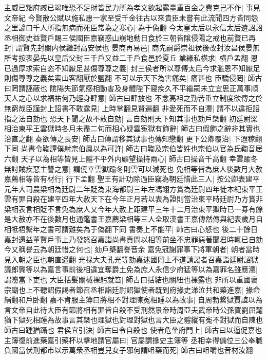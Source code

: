 主威已黜府臧已竭唯恐不足財皆民力所為孝文欲起露臺重百金之費克己不作|{
	事見文帝紀}
今賢散公賦以施私惠一家至受千金往古以來貴臣未嘗有此流聞四方皆同怨之里諺曰千人所指無病而死臣常為之寒心|{
	為于偽翻}
今太皇太后以永信太后遺詔詔丞相御史益賢戶賜三侯國臣嘉竊惑山崩地動日食於三朝皆隂侵陽之戒也前賢已再封|{
	謂賢先封關内侯繼封高安侯也}
晏商再易邑|{
	商先嗣爵崇祖侯後改封汝昌侯晏無所考按表晏先以皇后父封三千戶又益二千戶食邑於夏丘}
業緣私横求|{
	横戶孟翻}
恩已過厚求索自恣不知厭足甚傷尊尊之義|{
	封三侯者所以尊傅太后今求濫恩不知厭足則傷尊尊之義矣索山客翻厭於鹽翻}
不可以示天下為害痛矣|{
	痛甚也}
臣驕侵罔|{
	師古曰罔謂誣蔽也}
隂陽失節氣感相動害及身體陛下寢疾久不平繼嗣未立宜思正萬事順天人之心以求福祐何乃輕身肆意|{
	師古曰肆放也}
不念高祖之勤苦垂立制度欲傳之於無窮哉臣謹封上詔書不敢露見|{
	上時掌翻見賢遍翻}
非愛死而不自灋|{
	謂不以違拒詔指之法自劾也}
恐天下聞之故不敢自劾|{
	言自劾則天下知其事也劾戶槩翻}
初廷尉梁相治東平王雲獄時冬月未盡二旬而相心疑雲寃獄有飾辭|{
	師古曰假飾之辭非其實也治直之翻}
奏欲傳之長安|{
	師古曰傳謂移其獄事也傳知戀翻}
更下公卿覆治|{
	下遐稼翻下同}
尚書令鞫譚僕射宗伯鳳以為可許|{
	師古曰鞫及宗伯皆姓也宗伯以官為氏鞫音居六翻}
天子以為相等皆見上體不平外内顧望操持兩心|{
	師古曰操音千高翻}
幸雲踰冬無討賊疾惡主讐之意|{
	謂僥幸雲獄踰冬則雲可以減死也}
免相等皆為庶人後數月大赦嘉薦相等皆有材行|{
	行下孟翻}
聖王有計功除過臣竊為朝廷惜此三人|{
	按公卿表建平元年大司農梁相為廷尉二年貶為東海都尉三年左馮翊方賞為廷尉四年徙本紀東平王雲有罪自殺在建平四年大赦天下在今年正月若以表為證則當治東平時廷尉乃方賞非梁相表言相貶不言免為庶人又今年大赦上距建平三年十二月治東平獄時已一朞有餘是大赦亦不在後數月也通鑑書王嘉薦梁相等三人全取漢書王嘉傳然傳與紀表歲月自相牴牾繫年之書可謂難矣為于偽翻下同}
書奏上不能平|{
	師古曰心怒也}
後二十餘日嘉封還益董賢戶事上乃發怒召嘉詣尚書責問以相等前坐不忠罪惡著聞君時輒已自劾今又稱譽云為朝廷惜之何也|{
	劾戶槩翻譽音余}
嘉免冠謝罪事下將軍朝者|{
	朝者當時見入朝之臣也朝直遥翻}
光禄大夫孔光等劾嘉迷國罔上不道請謁者召嘉詣廷尉詔獄議郎龔等以為嘉言事前後相違宜奪爵土免為庶人永信少府猛等以為嘉罪名雖應灋|{
	謂灋當下吏也}
大臣括髮關械裸躬就笞|{
	師古曰括結也關紐也裸露也}
非所以重國褒宗廟也上不聽詔假謁者節召丞相詣廷尉詔獄使者既到府掾史涕泣共和藥進嘉|{
	掾命絹翻和戶卧翻}
嘉不肯服主簿曰將相不對理陳寃相踵以為故事|{
	自周勃繋獄賈誼以為言文帝自此待大臣有節將相有罪皆自殺不受刑然景帝時周亞夫武帝時公孫賀劉屈氂猶下獄死相踵為故事言其槩也理獄也對理對獄也言大臣之體縱有寃不對獄而自陳也師古曰踵猶躡也}
君侯宜引決|{
	師古曰令自殺也}
使者危坐府門上|{
	師古曰以逼促嘉也}
主簿復前進藥嘉引藥杯以擊地謂官屬曰|{
	官屬謂掾史主簿等}
丞相幸得備位三公奉職負國當伏刑都市以示萬衆丞相豈兒女子邪何謂咀藥而死|{
	師古曰咀嚼也音材汝翻}
